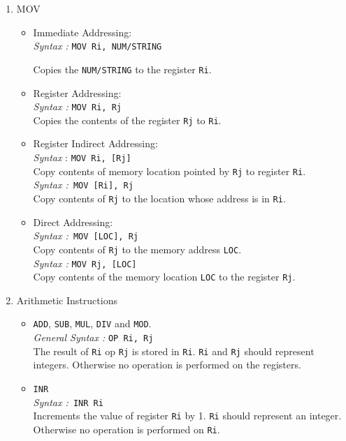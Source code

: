 \documentclass[11pt]{article}
\begin{document}
\begin{enumerate}
\item MOV
\begin{itemize}
\item Immediate Addressing:\\
\textit{Syntax :} \texttt{MOV Ri, NUM/STRING}

Copies the \texttt{NUM/STRING} to the register \texttt{Ri}.

\item Register Addressing:\\
\textit{Syntax :} \texttt{MOV Ri, Rj}\\
Copies the contents of the register \texttt{Rj} to \texttt{Ri}.

\item Register Indirect Addressing:\\
\textit{Syntax }: \texttt{MOV Ri, [Rj]}\\
Copy contents of memory location pointed by \texttt{Rj} to register \texttt{Ri}.\\
\textit{Syntax :}\texttt{ MOV [Ri], Rj} \\
Copy contents of \texttt{Rj} to the location whose address is in \texttt{Ri}.
\item Direct Addressing:\\
\textit{Syntax :}\texttt{ MOV [LOC], Rj}\\
Copy contents of \texttt{Rj}  to the memory address \texttt{LOC}.\\
\textit{Syntax :} \texttt{MOV Rj, [LOC]}\\
Copy contents of the memory location \texttt{LOC} to the register \texttt{Rj}.
\end{itemize}


\item Arithmetic Instructions

\begin{itemize}
\item \texttt{ADD}, \texttt{SUB}, \texttt{MUL}, \texttt{DIV} and \texttt{MOD}.\\
\textit{General Syntax :} \texttt{OP Ri, Rj}\\
The result of \texttt{Ri} op \texttt{Rj} is stored in \texttt{Ri}. \texttt{Ri} and \texttt{Rj} should represent integers. Otherwise no operation is performed on the registers.

\item \texttt{INR\\}
\textit{Syntax :}\texttt{ INR Ri}\\
Increments the value of register \texttt{Ri} by 1.  \texttt{Ri} should represent an integer. Otherwise no operation is performed on \texttt{Ri}.


\end{itemize}
\end{enumerate}
\end{document}
